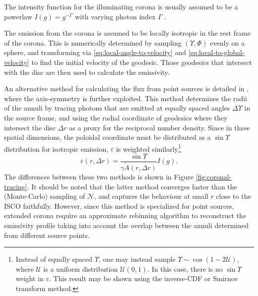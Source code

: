 \documentclass[fleqn,usenatbib]{mnras}
\begin{document}
The intensity function for the illuminating corona is usually assumed to be a powerlaw $I(g) = g^{-\Gamma}$ with varying photon index $\Gamma$ \citep{gonzalez_probing_2017}.

The emission from the corona is assumed to be locally isotropic in the rest frame of the corona. This is numerically determined by sampling $(\Upsilon, \Phi)$ evenly on a sphere, and transforming via \eqref{eq:local-angle-to-velocity} and \eqref{eq:local-to-global-velocity} to find the initial velocity of the geodesic. Those geodesics that intersect with the disc are then used to calculate the emissivity.

An alternative method for calculating the flux from point sources is detailed in \cite{dauser_irradiation_2013}, where the axis-symmetry is further exploited. This method determines the radii of the annuli by tracing photons that are emitted at equally spaced angles $\Delta \Upsilon$ in the source frame, and using the radial coordinate of geodesics where they intersect the disc $\Delta r$ as a proxy for the reciprocal number density. Since in three spatial dimensions, the poloidal coordinate must be distributed as a $\sin \Upsilon$ distribution for isotropic emission, $\varepsilon$ is weighted similarly\footnote{Instead of equally spaced $\Upsilon$, one may instead sample $\Upsilon \sim \cos (1 - 2 \mathcal{U})$, where $\mathcal{U}$ is a uniform distribution $\mathcal{U}(0,1)$. In this case, there is no $\sin \Upsilon$ weight in $\varepsilon$. This result may be shown using the inverse-CDF or Smirnov transform method.}
\begin{equation}
    \varepsilon(r, \Delta r) = \frac{\sin \Upsilon}{\gamma \tilde{A}(r, \Delta r)} I(g).
\end{equation}
The differences between these two methods is shown in Figure \ref{fig:coronal-tracing}. It should be noted that the latter method converges faster than the (Monte-Carlo) sampling of $\mathcal{N}$, and captures the behaviour at small $r$ close to the ISCO faithfully. However, since this method is specialized for point sources, extended corona require an approximate rebinning algorithm to reconstruct the emissivity profile taking into account the overlap between the annuli determined from different source points.
\end{document}
